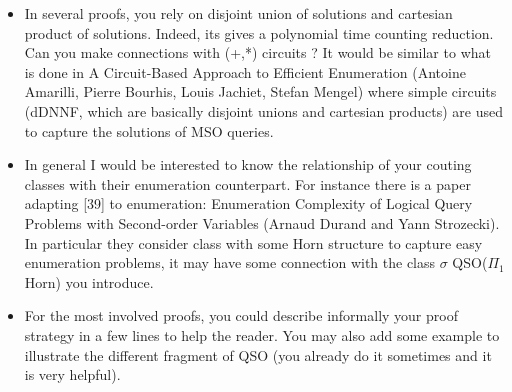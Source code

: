 \begin{itemize}
		\setlength\itemsep{0.5em}
\item In several proofs, you rely on disjoint union of solutions and cartesian product of solutions. Indeed, its gives a polynomial time counting reduction. Can you make connections with (+,*) circuits ? It would be similar to what is done in A Circuit-Based Approach to Efficient Enumeration (Antoine Amarilli, Pierre Bourhis, Louis Jachiet, Stefan Mengel) where simple circuits (dDNNF, which are basically disjoint unions and cartesian products) are used to capture the solutions of MSO queries.

\item In general I would be interested to know the relationship of your couting classes with their enumeration counterpart. 
For instance there is a paper adapting [39] to enumeration: Enumeration Complexity of Logical Query Problems with Second-order Variables (Arnaud Durand and Yann Strozecki). In particular they consider class with some Horn structure to capture easy enumeration problems, it may have some connection with the class $\sigma$ QSO($\Pi_1$ Horn) you introduce.

\item For the most involved proofs, you could describe informally your proof strategy in a few lines to help the reader. You may also add some example to illustrate the different fragment of QSO (you already do it sometimes and it is very helpful).


\end{itemize}
